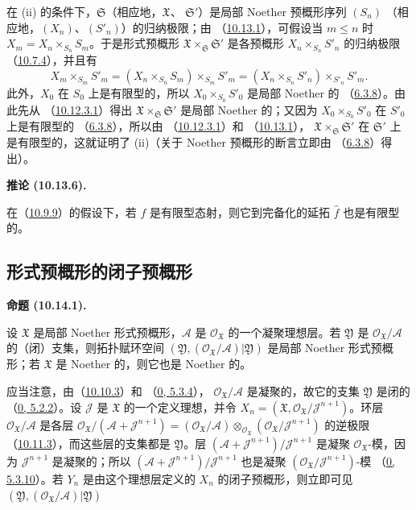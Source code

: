 \documentclass[UTF8,fontset=none,11pt,oneside,openany]{ctexbook}
\newenvironment{proposition}[1][]{%
  \par\medskip\noindent\textbf{命题 (#1).}\ %
}{\par}
\newenvironment{corollary}[1][]{%
  \par\medskip\noindent\textbf{推论 (#1).}\ %
}{\par}
\let\EGAOriginalLabel\label
\renewcommand{\label}[1]{\phantomsection\EGAOriginalLabel{#1}}
\begin{document}
在 (ii) 的条件下，$\mathfrak{S}$（相应地，$\mathfrak{X}$、
$\mathfrak{S}'$）是局部 Noether 预概形序列 $(S_n)$
（相应地，$(X_n)$、$(S'_n)$）的归纳极限；由
（\hyperref[I.10.13.1-fr]{10.13.1}），可假设当 $m\leq n$ 时
$X_m=X_n\times_{S_n}S_m$。于是形式预概形
$\mathfrak{X}\times_{\mathfrak{S}}\mathfrak{S}'$ 是各预概形
$X_n\times_{S_n}S'_n$ 的归纳极限
（\hyperref[I.10.7.4-fr]{10.7.4}），并且有
\[
  X_m\times_{S_m}S'_m
  =(X_n\times_{S_n}S_m)\times_{S_m}S'_m
  =(X_n\times_{S_n}S'_n)\times_{S'_n}S'_m.
\]
此外，$X_0$ 在 $S_0$ 上是有限型的，所以
$X_0\times_{S_0}S'_0$ 是局部 Noether 的
（\hyperref[I.6.3.8-fr]{6.3.8}）。由此先从
（\hyperref[I.10.12.3.1-fr]{10.12.3.1}）得出
$\mathfrak{X}\times_{\mathfrak{S}}\mathfrak{S}'$ 是局部 Noether 的；又因为
$X_0\times_{S_0}S'_0$ 在 $S'_0$ 上是有限型的
（\hyperref[I.6.3.8-fr]{6.3.8}），所以由
（\hyperref[I.10.12.3.1-fr]{10.12.3.1}）和
（\hyperref[I.10.13.1-fr]{10.13.1}），
$\mathfrak{X}\times_{\mathfrak{S}}\mathfrak{S}'$ 在
$\mathfrak{S}'$ 上是有限型的，这就证明了 (ii)（关于 Noether 预概形的断言立即由
（\hyperref[I.6.3.8-fr]{6.3.8}）得出）。

\begin{corollary}[10.13.6]
\label{I.10.13.6-fr}
在（\hyperref[I.10.9.9-fr]{10.9.9}）的假设下，若 $f$ 是有限型态射，则它到完备化的延拓
$\widehat f$ 也是有限型的。
\end{corollary}

\subsection{形式预概形的闭子预概形}
\label{subsection:I.10.14-fr}

\begin{proposition}[10.14.1]
\label{I.10.14.1-fr}
设 $\mathfrak{X}$ 是局部 Noether 形式预概形，$\mathscr{A}$ 是
$\mathscr{O}_{\mathfrak{X}}$ 的一个凝聚理想层。若 $\mathfrak{Y}$ 是
$\mathscr{O}_{\mathfrak{X}}/\mathscr{A}$ 的（闭）支集，则拓扑赋环空间
$(\mathfrak{Y},(\mathscr{O}_{\mathfrak{X}}/\mathscr{A})|\mathfrak{Y})$ 是局部
Noether 形式预概形；若 $\mathfrak{X}$ 是 Noether 的，则它也是 Noether 的。
\end{proposition}

应当注意，由（\hyperref[I.10.10.3-fr]{10.10.3}）和
（\hyperref[0.5.3.4-fr]{0, 5.3.4}），
$\mathscr{O}_{\mathfrak{X}}/\mathscr{A}$ 是凝聚的，故它的支集
$\mathfrak{Y}$ 是闭的（\hyperref[0.5.2.2-fr]{0, 5.2.2}）。设
$\mathscr{J}$ 是 $\mathfrak{X}$ 的一个定义理想，并令
$X_n=(\mathfrak{X},\mathscr{O}_{\mathfrak{X}}/\mathscr{J}^{n+1})$。环层
$\mathscr{O}_{\mathfrak{X}}/\mathscr{A}$ 是各层
$\mathscr{O}_{\mathfrak{X}}/(\mathscr{A}+\mathscr{J}^{n+1})
=(\mathscr{O}_{\mathfrak{X}}/\mathscr{A})
\otimes_{\mathscr{O}_{\mathfrak{X}}}
(\mathscr{O}_{\mathfrak{X}}/\mathscr{J}^{n+1})$ 的逆极限
（\hyperref[I.10.11.3-fr]{10.11.3}），而这些层的支集都是
$\mathfrak{Y}$。层
$(\mathscr{A}+\mathscr{J}^{n+1})/\mathscr{J}^{n+1}$ 是凝聚
$\mathscr{O}_{\mathfrak{X}}$-模，因为 $\mathscr{J}^{n+1}$ 是凝聚的；所以
$(\mathscr{A}+\mathscr{J}^{n+1})/\mathscr{J}^{n+1}$ 也是凝聚
$(\mathscr{O}_{\mathfrak{X}}/\mathscr{J}^{n+1})$-模
（\hyperref[0.5.3.10-fr]{0, 5.3.10}）。若 $Y_n$ 是由这个理想层定义的
$X_n$ 的闭子预概形，则立即可见
$(\mathfrak{Y},(\mathscr{O}_{\mathfrak{X}}/\mathscr{A})|\mathfrak{Y})$
\end{document}
